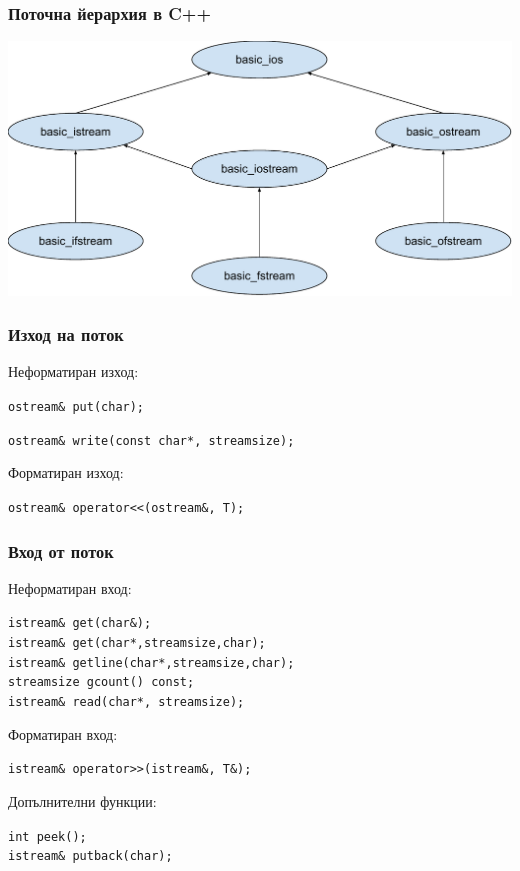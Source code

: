\documentclass{beamer}
\begin{document}
\begin{frame}
  \frametitle{Поточна йерархия в C++}

  \includegraphics[width=\textwidth]{images/stream_hierarchy.pdf}
\end{frame}

\begin{frame}[fragile]
  \frametitle{Изход на поток}

  Неформатиран изход:
  \vspace{1em}

  \verb#ostream& put(char);#

  \verb#ostream& write(const char*, streamsize);#

  \vspace{3em}

  Форматиран изход:
  \vspace{1em}
  
  \verb#ostream& operator<<(ostream&, T);#
\end{frame}

\begin{frame}[fragile]
  \frametitle{Вход от поток}

  Неформатиран вход:
  \vspace{1em}

  \verb#istream& get(char&);#\\
  \verb#istream& get(char*,streamsize,char);#\\
  \verb#istream& getline(char*,streamsize,char);#\\
  \verb#streamsize gcount() const;#\\
  \verb#istream& read(char*, streamsize);#
  \vspace{2em}

  Форматиран вход:
  \vspace{1em}

  \verb#istream& operator>>(istream&, T&);#  

  \vspace{2em}

  Допълнителни функции:

  \verb#int peek();#\\
  \verb#istream& putback(char);#
\end{frame}
\end{document}
